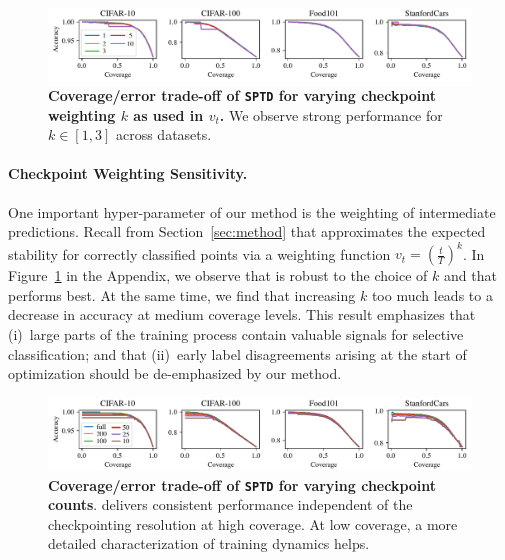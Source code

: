 \begin{figure}[t]
  \centering
  \includegraphics[width=\linewidth]{figs/sptd/k_ablation.pdf}
\caption[Coverage/error trade-off of \texttt{SPTD} for varying checkpoint weighting $k$ as used in $v_t$.]{\textbf{Coverage/error trade-off of \texttt{SPTD} for varying checkpoint weighting $k$ as used in $v_t$.} We observe strong performance for $k \in [1,3]$ across datasets.
}
\label{fig:weighting}
\end{figure}

\paragraph{Checkpoint Weighting Sensitivity.} One important hyper-parameter of our method is the weighting of intermediate predictions. Recall from Section~\ref{sec:method} that \sptd approximates the expected stability for correctly classified points via a weighting function $v_t = (\frac{t}{T})^k$. In Figure~\ref{fig:weighting} in the Appendix, we observe  that \sptd is robust to the choice of $k$ and that  performs best. At the same time, we find that increasing $k$ too much leads to a decrease in accuracy at medium coverage levels. This result emphasizes that (i)~large parts of the training process contain valuable signals for selective classification; and that (ii)~early label disagreements arising at the start of optimization should be de-emphasized by our method.

\begin{figure}[t]
  \centering
  \includegraphics[width=\linewidth]{figs/sptd/checkp_ablation.pdf}
\caption[Coverage/error trade-off of \texttt{SPTD} for varying checkpoint counts.]{\textbf{Coverage/error trade-off of \texttt{SPTD} for varying checkpoint counts}. \sptd delivers consistent performance independent of the checkpointing resolution at high coverage. At low coverage, a more detailed characterization of training dynamics helps.
}
\label{fig:resolution}
\end{figure}

